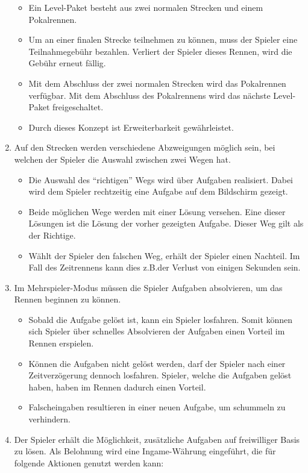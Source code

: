 \begin{enumerate}
		\begin{itemize}
			\item{Ein Level-Paket besteht aus zwei normalen Strecken und einem Pokalrennen.}
			\item{Um an einer finalen Strecke teilnehmen zu können, muss der Spieler eine Teilnahmegebühr bezahlen. Verliert der Spieler dieses Rennen, wird die Gebühr erneut fällig.}
			\item{Mit dem Abschluss der zwei normalen Strecken wird das Pokalrennen verfügbar. Mit dem Abschluss des Pokalrennens wird das nächste Level-Paket freigeschaltet.}
			\item{Durch dieses Konzept ist Erweiterbarkeit gewährleistet.}
		\end{itemize}
		\item{Auf den Strecken werden verschiedene Abzweigungen möglich sein, bei welchen der Spieler die Auswahl zwischen zwei Wegen hat.}
		\begin{itemize}
			\item{Die Auswahl des \enquote{richtigen} Wegs wird über Aufgaben realisiert. Dabei wird dem Spieler rechtzeitig eine Aufgabe auf dem Bildschirm gezeigt.}
			\item{Beide möglichen Wege werden mit einer Lösung versehen. Eine dieser Lösungen ist die Lösung der vorher gezeigten Aufgabe. Dieser Weg gilt als der Richtige.}
			\item{Wählt der Spieler den falschen Weg, erhält der Spieler einen Nachteil. Im Fall des Zeitrennens kann dies z.B.\@ der Verlust von einigen Sekunden sein.}
		\end{itemize}
		\item{Im Mehrspieler-Modus müssen die Spieler Aufgaben absolvieren, um das Rennen beginnen zu können.}
			\begin{itemize}
				\item{Sobald die Aufgabe gelöst ist, kann ein Spieler losfahren. Somit können sich Spieler über schnelles Absolvieren der Aufgaben einen Vorteil im Rennen erspielen.}
				\item{Können die Aufgaben nicht gelöst werden, darf der Spieler nach einer Zeitverzögerung dennoch losfahren. Spieler, welche die Aufgaben gelöst haben, haben im Rennen dadurch einen Vorteil.}
				\item{Falscheingaben resultieren in einer neuen Aufgabe, um schummeln zu verhindern.}
			\end{itemize}
		\item{Der Spieler erhält die Möglichkeit, zusätzliche Aufgaben auf freiwilliger Basis zu lösen. Als Belohnung wird eine Ingame-Währung eingeführt, die für folgende Aktionen genutzt werden kann:}

\end{enumerate}

